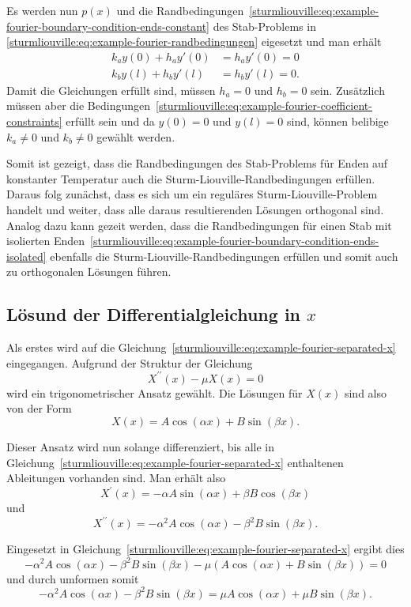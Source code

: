 Es werden nun $p(x)$ und die 
Randbedingungen~\eqref{sturmliouville:eq:example-fourier-boundary-condition-ends-constant}
des Stab-Problems in \eqref{sturmliouville:eq:example-fourier-randbedingungen}
eigesetzt und man erhält
\[
\begin{aligned}
	k_a y(0) + h_a y'(0) &= h_a y'(0) = 0 \\
	k_b y(l) + h_b y'(l) &= h_b y'(l) = 0.
\end{aligned}
\]
Damit die Gleichungen erfüllt sind, müssen $h_a = 0$ und $h_b = 0$ sein.
Zusätzlich müssen aber die 
Bedingungen~\eqref{sturmliouville:eq:example-fourier-coefficient-constraints}
erfüllt sein und da $y(0) = 0$ und $y(l) = 0$ sind, können belibige $k_a \neq 0$
und $k_b \neq 0$ gewählt werden.

Somit ist gezeigt, dass die Randbedingungen des Stab-Problems für Enden auf
konstanter Temperatur auch die Sturm-Liouville-Randbedingungen erfüllen.
Daraus folg zunächst, dass es sich um ein reguläres Sturm-Liouville-Problem
handelt und weiter, dass alle daraus resultierenden Lösungen orthogonal sind.
Analog dazu kann gezeit werden, dass die Randbedingungen für einen Stab mit
isolierten
Enden~\eqref{sturmliouville:eq:example-fourier-boundary-condition-ends-isolated}
ebenfalls die Sturm-Liouville-Randbedingungen erfüllen und
somit auch zu orthogonalen Lösungen führen.

%
%

\subsection{Lösund der Differentialgleichung in $x$}
Als erstes wird auf die
Gleichung~\eqref{sturmliouville:eq:example-fourier-separated-x} eingegangen.
Aufgrund der Struktur der Gleichung
\[
    X^{\prime \prime}(x) - \mu X(x)
    =
    0
\]
wird ein trigonometrischer Ansatz gewählt.
Die Lösungen für $X(x)$ sind also von der Form
\[
    X(x)
    =
    A \cos \left( \alpha x\right) + B \sin \left( \beta x\right).
\]

Dieser Ansatz wird nun solange differenziert, bis alle in
Gleichung~\eqref{sturmliouville:eq:example-fourier-separated-x} enthaltenen
Ableitungen vorhanden sind.
Man erhält also
\[
    X^{\prime}(x)
    =
    - \alpha A \sin \left( \alpha x \right) +
    \beta B \cos \left( \beta x \right)
\]
und
\[
    X^{\prime \prime}(x)
    =
    -\alpha^{2} A \cos \left( \alpha x \right) -
    \beta^{2} B \sin \left( \beta x \right).
\]

Eingesetzt in Gleichung~\eqref{sturmliouville:eq:example-fourier-separated-x}
ergibt dies
\[
    -\alpha^{2}A\cos(\alpha x) - \beta^{2}B\sin(\beta x) -
    \mu\left(A\cos(\alpha x) + B\sin(\beta x)\right)
    =
    0
\]
und durch umformen somit
\[
    -\alpha^{2}A\cos(\alpha x) - \beta^{2}B\sin(\beta x)
    =
    \mu A\cos(\alpha x) + \mu B\sin(\beta x).
\]

